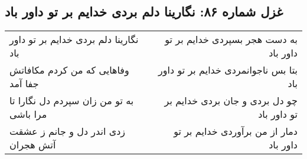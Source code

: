 \begin{center}
\section*{غزل شماره ۸۶: نگارینا دلم بردی خدایم بر تو داور باد}
\label{sec:086}
\begin{longtable}{l p{0.5cm} r}
نگارینا دلم بردی خدایم بر تو داور باد
&&
به دست هجر بسپردی خدایم بر تو داور باد
\\
وفاهایی که من کردم مکافاتش جفا آمد
&&
بتا بس ناجوانمردی خدایم بر تو داور باد
\\
به تو من زان سپردم دل نگارا تا مرا باشی
&&
چو دل بردی و جان بردی خدایم بر تو داور باد
\\
زدی اندر دل و جانم ز عشقت آتش هجران
&&
دمار از من برآوردی خدایم بر تو داور باد
\\
\end{longtable}
\end{center}
